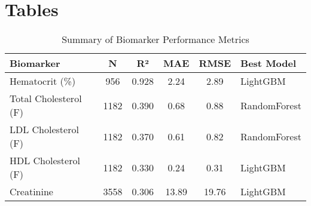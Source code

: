 \documentclass[11pt,a4paper]{article}
\begin{document}

\clearpage

\section*{Tables}

\begin{table}[ht]
    \centering
    \caption{Summary of Biomarker Performance Metrics}
    \label{tab:performance_summary}
    \begin{tabular}{lccccl}
        \toprule
        \textbf{Biomarker} & \textbf{N} & \textbf{R²} & \textbf{MAE} & \textbf{RMSE} & \textbf{Best Model} \\
        \midrule
        Hematocrit (\%) & 956 & 0.928 & 2.24 & 2.89 & LightGBM \\
        Total Cholesterol (F) & 1182 & 0.390 & 0.68 & 0.88 & RandomForest \\
        LDL Cholesterol (F) & 1182 & 0.370 & 0.61 & 0.82 & RandomForest \\
        HDL Cholesterol (F) & 1182 & 0.330 & 0.24 & 0.31 & LightGBM \\
        Creatinine & 3558 & 0.306 & 13.89 & 19.76 & LightGBM \\
        \bottomrule
    \end{tabular}
\end{table}
\end{document}
